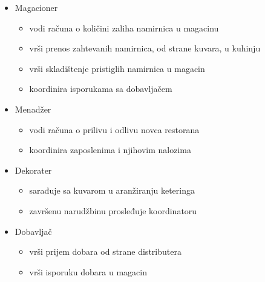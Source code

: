 \begin{itemize}
\begin{itemize}
    \end{itemize}
    \item Magacioner
    \begin{itemize}
        \item vodi računa o količini zaliha namirnica u magacinu
        \item vrši prenos zahtevanih namirnica, od strane kuvara, u kuhinju
        \item vrši skladištenje pristiglih namirnica u magacin
        \item koordinira isporukama sa dobavljačem
    \end{itemize}
    \item Menadžer
    \begin{itemize}
        \item vodi računa o prilivu i odlivu novca restorana
        \item koordinira zaposlenima i njihovim nalozima
    \end{itemize}
    \item Dekorater
    \begin{itemize}
        \item sarađuje sa kuvarom u aranžiranju keteringa
        \item završenu narudžbinu prosleđuje koordinatoru
    \end{itemize}
    \item Dobavljač
    \begin{itemize}
        \item vrši prijem dobara od strane distributera
        \item vrši isporuku dobara u magacin
    \end{itemize}
\end{itemize}


